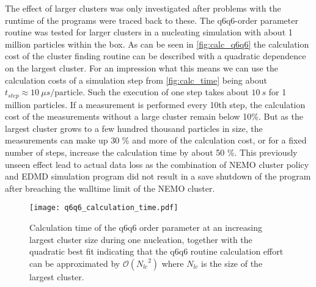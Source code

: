 
The effect of larger clusters was only investigated after problems with the runtime of the programs were traced back to these. The q6q6-order parameter routine was tested for larger clusters in a nucleating simulation with about 1 million particles within the box. As can be seen in \autoref{fig:calc_q6q6} the calculation cost of the cluster finding routine can be described with a quadratic dependence on the largest cluster. For an impression what this means we can use the calculation costs of a simulation step from \autoref{fig:calc_time} being about $t_{step} \approx \SI{10}{\mu s \per \text{particle} }$. Such the execution of one step takes about $\SI{10}{s}$ for 1 million particles. If a measurement is performed every 10th step, the calculation cost of the measurements without a large cluster remain below 10\%. But as the largest cluster grows to a few hundred thousand particles in size, the measurements can make up 30 \% and more of the calculation cost, or for a fixed number of steps, increase the calculation time by about 50 \%. This previously unseen effect lead to actual data loss as the combination of NEMO cluster policy and EDMD simulation program did not result in a save shutdown of the program after breaching the walltime limit of the NEMO cluster.\\

\begin{figure}[h!]
\centering
\texttt{[image: q6q6\_calculation\_time.pdf]}
\caption{Calculation time of the q6q6 order parameter at an increasing largest cluster size during one nucleation, together with the quadratic best fit indicating that the q6q6 routine calculation effort can be approximated by $\mathcal{O}({N_{lc}}^2)$ where $N_{lc}$ is the size of the largest cluster.}
\label{fig:calc_q6q6}
\end{figure}


